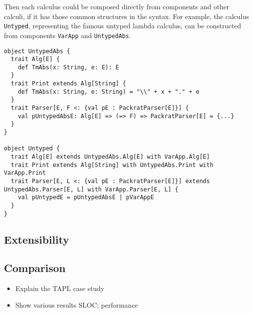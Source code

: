 Then each calculus could be composed directly from components and other calculi, if it has those common structures in the syntax. For example, the calculus \lstinline{Untyped}, representing the famous untyped lambda calculus, can be constructed from components \lstinline{VarApp} and \lstinline{UntypedAbs}.

\begin{lstlisting}
object UntypedAbs {
  trait Alg[E] {
    def TmAbs(x: String, e: E): E
  }
  trait Print extends Alg[String] {
    def TmAbs(x: String, e: String) = "\\" + x + "." + e
  }
  trait Parser[E, F <: {val pE : PackratParser[E]}] {
    val pUntypedAbsE: Alg[E] => (=> F) => PackratParser[E] = {...}
  }
}

object Untyped {
  trait Alg[E] extends UntypedAbs.Alg[E] with VarApp.Alg[E]
  trait Print extends Alg[String] with UntypedAbs.Print with VarApp.Print
  trait Parser[E, L <: {val pE : PackratParser[E]}] extends UntypedAbs.Parser[E, L] with VarApp.Parser[E, L] {
    val pUntypedE = pUntypedAbsE | pVarAppE
  }
}
\end{lstlisting}

\subsection{Extensibility}\label{subsec:extensibility}

\subsection{Comparison}\label{subsec:comparison}

\begin{itemize}
\item Explain the TAPL case study
\item Show various results SLOC; performance
\end{itemize}
